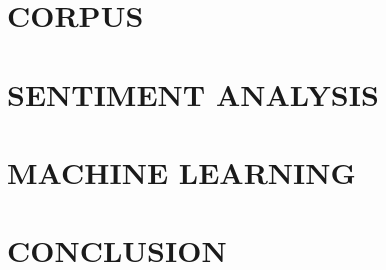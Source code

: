 \documentclass[reqno,12pt,oneside,letter]{report} %
\begin{document}
 \chapter{CORPUS}
 \label{chap:Corpus}
 

 \chapter{SENTIMENT ANALYSIS}
  \label{chap:Sentiment Analysis}
  

 \chapter{MACHINE LEARNING}
 \label{chap:Machine Learning}
 

 \chapter{CONCLUSION}
 \label{chap:Conclusion}
 



\startbibliography
 \begin{singlespace} %
 \end{singlespace}

%
\end{document}
